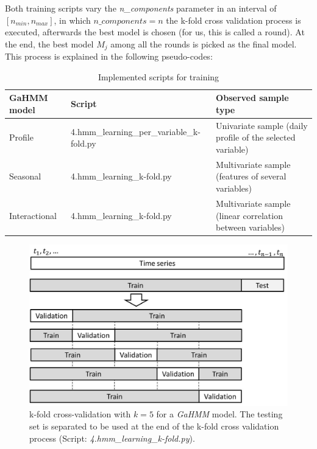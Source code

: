 Both training scripts vary the \textit{n\_components} parameter in an interval of $[n_{min}, n_{max}]$, in which $n\_components = n$ the k-fold cross validation process is executed, afterwards the best model is chosen (for us, this is called a round). At the end, the best model $M_j$ among all the rounds is picked as the final model. This process is explained in the following pseudo-codes:


\begin{table}[]
\centering
\scriptsize
\caption{Implemented scripts for training}
\label{scripts_impl}
\begin{tabular}{|l|l|l|}
\hline
\textbf{GaHMM model} & \textbf{Script}                           & \textbf{Observed sample type}                              \\ \hline
Profile              & 4.hmm\_learning\_per\_variable\_k-fold.py & Univariate sample (daily profile of the selected variable) \\ \hline
Seasonal             & 4.hmm\_learning\_k-fold.py                & Multivariate sample (features of several variables)        \\ \hline
Interactional        & 4.hmm\_learning\_k-fold.py                & Multivariate sample (linear correlation between variables) \\ \hline
\end{tabular}
\end{table}


\begin{figure}[h!]
  \vspace{0.5em} %
  \includegraphics[scale=0.45]{Figures/k-fold-1.jpg}
  \caption{k-fold cross-validation with $k=5$ for a \textit{GaHMM} model. The testing
set is separated to be used at the end of the k-fold cross validation process (Script: \textit{4.hmm\_learning\_k-fold.py}).}
  \label{fig:k-fold-1}
\end{figure}


